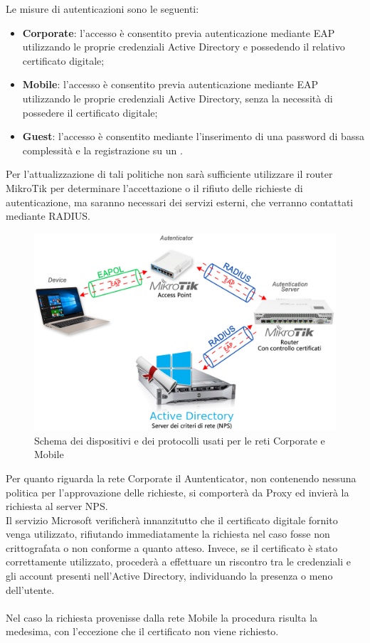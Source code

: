 \documentclass[Realizzazione.tex]{subfiles}
\begin{document}
Le misure di autenticazioni sono le seguenti:
\begin{itemize}
	\item \textbf{Corporate}: l'accesso è consentito previa autenticazione mediante EAP utilizzando le proprie credenziali Active Directory e possedendo il relativo certificato digitale;
	\item \textbf{Mobile}: l'accesso è consentito previa autenticazione mediante EAP utilizzando le proprie credenziali Active Directory, senza la necessità di possedere il certificato digitale;
	\item \textbf{Guest}: l'accesso è consentito mediante l'inserimento di una password di bassa complessità e la registrazione su un .
\end{itemize}

Per l'attualizzazione di tali politiche non sarà sufficiente utilizzare il router MikroTik per determinare l'accettazione o il rifiuto delle richieste di autenticazione, ma saranno necessari dei servizi esterni, che verranno contattati mediante RADIUS. 


\newpage
\begin{figure}[H]
	\centering
	\includegraphics[width=1.1\linewidth]{"images/Schema_tecnologie_NPS"}
	\caption{Schema dei dispositivi e dei protocolli usati per le reti Corporate e Mobile}
	\label{fig:Schema dei dispositivi e dei protocolli usati per le reti Corporate e Mobile}
\end{figure}
Per quanto riguarda la rete Corporate il Auntenticator, non contenendo nessuna politica per l'approvazione delle richieste, si comporterà da Proxy ed invierà la richiesta al server NPS.\\
Il servizio Microsoft verificherà innanzitutto che il certificato digitale fornito venga utilizzato, rifiutando immediatamente la richiesta nel caso fosse non crittografata o non conforme a quanto atteso. Invece, se il certificato è stato correttamente utilizzato, procederà a effettuare un riscontro tra le credenziali e gli account presenti nell'Active Directory, individuando la presenza o meno dell'utente.\\\\
Nel caso la richiesta provenisse dalla rete Mobile la procedura risulta la medesima, con l'eccezione che il certificato non viene richiesto.
\end{document}
